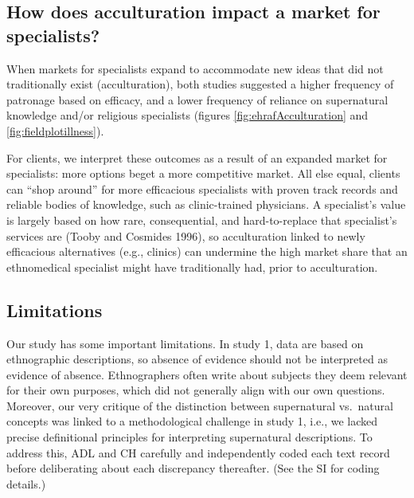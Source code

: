 \documentclass[
  11pt,
]{article}
\begin{document}
\hypertarget{how-does-acculturation-impact-a-market-for-specialists}{%
\subsection{How does acculturation impact a market for specialists?}\label{how-does-acculturation-impact-a-market-for-specialists}}

When markets for specialists expand to accommodate new ideas that did not traditionally exist (acculturation), both studies suggested a higher frequency of patronage based on efficacy, and a lower frequency of reliance on supernatural knowledge and/or religious specialists (figures \ref{fig:ehrafAcculturation} and \ref{fig:fieldplotillness}).

For clients, we interpret these outcomes as a result of an expanded market for specialists: more options beget a more competitive market. All else equal, clients can ``shop around'' for more efficacious specialists with proven track records and reliable bodies of knowledge, such as clinic-trained physicians. A specialist's value is largely based on how rare, consequential, and hard-to-replace that specialist's services are (Tooby and Cosmides 1996), so acculturation linked to newly efficacious alternatives (e.g., clinics) can undermine the high market share that an ethnomedical specialist might have traditionally had, prior to acculturation.

\hypertarget{limitations}{%
\subsection{Limitations}\label{limitations}}

Our study has some important limitations. In study 1, data are based on ethnographic descriptions, so absence of evidence should not be interpreted as evidence of absence. Ethnographers often write about subjects they deem relevant for their own purposes, which did not generally align with our own questions. Moreover, our very critique of the distinction between supernatural vs.~natural concepts was linked to a methodological challenge in study 1, i.e., we lacked precise definitional principles for interpreting supernatural descriptions. To address this, ADL and CH carefully and independently coded each text record before deliberating about each discrepancy thereafter. (See the SI for coding details.)
\end{document}
